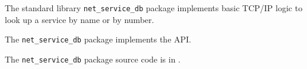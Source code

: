 
The standard library {\tt net\_service\_db} package implements basic {\sc TCP/IP} logic to 
look up a service by name or by number.

The {\tt {\tt net\_service\_db}} package implements the  API.

The {\tt {\tt net\_service\_db}} package source code is in .

